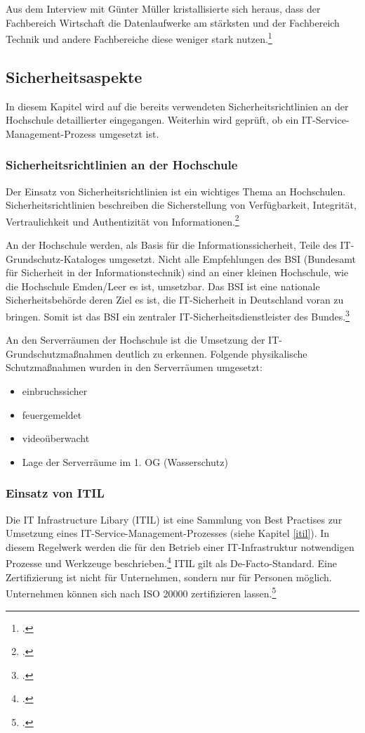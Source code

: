 Aus dem Interview mit Günter Müller kristallisierte sich heraus, dass der Fachbereich Wirtschaft die Datenlaufwerke am stärksten und der Fachbereich Technik und andere Fachbereiche diese weniger stark nutzen.\footcite{gunter_muller_interview}

\subsection{Sicherheitsaspekte}
\label{subsection_sicherheitsaspekte}
In diesem Kapitel wird auf die bereits verwendeten Sicherheitsrichtlinien an der Hochschule detaillierter eingegangen. Weiterhin wird geprüft, ob ein IT-Service-Management-Prozess  umgesetzt ist.

\subsubsection{Sicherheitsrichtlinien an der Hochschule}
Der Einsatz von Sicherheitsrichtlinien ist ein wichtiges Thema an Hochschulen. Sicherheitsrichtlinien beschreiben die Sicherstellung von Verfügbarkeit, Integrität, Vertraulichkeit und Authentizität von Informationen.\footcite[Vgl.][]{sicherheitsrichtlinien_datenschutz-berlin.de_2008}

An der Hochschule werden, als Basis für die Informationssicherheit, Teile des IT-Grundschutz-Kataloges umgesetzt. Nicht alle Empfehlungen des BSI (Bundesamt für Sicherheit in der Informationstechnik) sind an einer kleinen Hochschule, wie die Hochschule Emden/Leer es ist,  umsetzbar. Das BSI ist eine nationale Sicherheitsbehörde deren Ziel es ist, die IT-Sicherheit in Deutschland voran zu bringen. Somit ist das BSI ein zentraler IT-Sicherheitsdienstleister des Bundes.\footcite[Vgl.][]{sicherheitsrichtlinien_bsi.bund.de_2015}

An den Serverräumen der Hochschule ist die Umsetzung der IT-Grundschutzmaßnahmen deutlich zu erkennen.
\newpage
Folgende physikalische Schutzmaßnahmen wurden in den Serverräumen umgesetzt:
\begin{itemize}
	\item einbruchssicher
	\item feuergemeldet
	\item videoüberwacht
	\item Lage der Serverräume im 1. OG (Wasserschutz)
\end{itemize}

\subsubsection{Einsatz von ITIL}
Die IT Infrastructure Libary (ITIL) ist eine Sammlung von Best Practises zur Umsetzung eines IT-Service-Management-Prozesses (siehe Kapitel \ref{itil}). In diesem Regelwerk werden die für den Betrieb einer IT-Infrastruktur notwendigen Prozesse und Werkzeuge beschrieben.\footcite[Vgl.][]{itil_dxperts.de_2015} ITIL gilt als De-Facto-Standard. Eine Zertifizierung ist nicht für Unternehmen, sondern nur für Personen möglich. Unternehmen können sich nach ISO 20000 zertifizieren lassen.\footcite[Vgl.][]{itil_wirtschaftslexikon.gabler}

